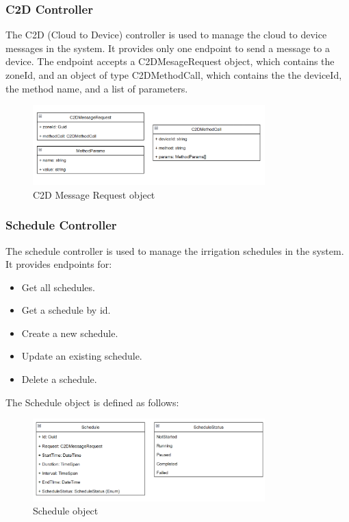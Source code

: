 \subsubsection{C2D Controller}
The C2D (Cloud to Device) controller is used to manage the cloud to device messages in the system.
It provides only one endpoint to send a message to a device. The endpoint accepts a C2DMesageRequest object, 
which contains the zoneId, and an object of type C2DMethodCall, which contains the the deviceId, the method name, and a list of parameters.
\begin{figure}[H]
    \centering
    \includegraphics[width=0.8\textwidth]{images/c2d-message-request.png}
    \caption{C2D Message Request object}
    \label{fig:c2d-request}
\end{figure}

\subsubsection{Schedule Controller}
The schedule controller is used to manage the irrigation schedules in the system.
It provides endpoints for:
\begin{itemize}
    \item Get all schedules.
    \item Get a schedule by id.
    \item Create a new schedule.
    \item Update an existing schedule.
    \item Delete a schedule.
\end{itemize}

The Schedule object is defined as follows:
\begin{figure}[H]
    \centering
    \includegraphics[width=0.8\textwidth]{images/schedule.png}
    \caption{Schedule object}
    \label{fig:schedule-object}
\end{figure}


